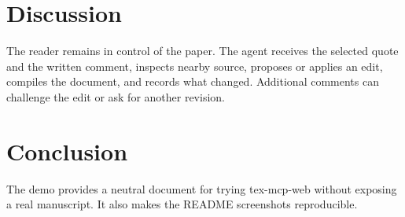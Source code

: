 \documentclass[10pt]{article}
\begin{document}
\section{Discussion}
The reader remains in control of the paper. The agent receives the selected
quote and the written comment, inspects nearby source, proposes or applies an
edit, compiles the document, and records what changed. Additional comments can
challenge the edit or ask for another revision.

\section{Conclusion}
The demo provides a neutral document for trying tex-mcp-web without exposing a
real manuscript. It also makes the README screenshots reproducible.
\end{document}
